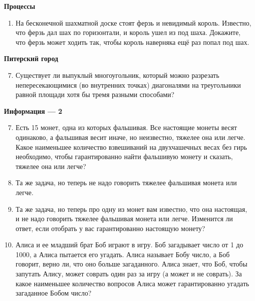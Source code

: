 \documentclass{article}
\begin{document}
\large
	
	\begin{center}
		\textbf{Процессы}
	\end{center}
	
	\begin{enumerate}
		
		\item[\protect\fbox{10}] На бесконечной шахматной доске стоят ферзь и невидимый король. Известно, что ферзь дал шах по горизонтали, и король ушел из под шаха. Докажите, что ферзь может ходить так, чтобы король наверняка ещё раз попал под шах.
		
	\end{enumerate}

	\begin{center}
		\textbf{Питерский город}
	\end{center}
	\begin{enumerate}[label*=\protect\fbox{\arabic{enumi}}]
		\setcounter{enumi}{6}
		
		\item Существует ли выпуклый многоугольник, который можно разрезать непересекающимися (во внутренних точках) диагоналями на треугольники равной площади хотя бы тремя разными способами?
		
	\end{enumerate}

	
	\begin{center}
		\textbf{Информация --- 2}
	\end{center}
	
	\begin{enumerate}[label*=\protect\fbox{\arabic{enumi}}]
	
		\setcounter{enumi}{6}
		\item Есть 15 монет, одна из которых фальшивая. Все настоящие монеты весят одинаково, а фальшивая весит иначе, но неизвестно, тяжелее она или легче. Какое наименьшее количество взвешиваний на двухчашечных весах без гирь необходимо, чтобы гарантированно найти фальшивую монету и сказать, тяжелее она или легче?
		
		\setcounter{enumi}{7}
		\item Та же задача, но теперь не надо говорить тяжелее фальшивая монета или легче.
		
		\setcounter{enumi}{8}
		\item Та же задача, но теперь про одну из монет вам известно, что она настоящая, и не надо говорить тяжелее фальшивая монета или легче. Изменится ли ответ, если отобрать у вас гарантированно настоящую монету?
		
		\setcounter{enumi}{9}
		\item Алиса и ее младший брат Боб играют в игру. Боб загадывает число от 1 до 1000, а Алиса пытается его угадать. Алиса называет Бобу число, а Боб говорит, верно ли, что оно больше загаданного. Алиса знает, что Боб, чтобы запутать Алису, может соврать один раз за игру (а может и не соврать). За какое наименьшее количество вопросов Алиса может гарантированно угадать загаданное Бобом число?
	\end{enumerate}
	
\end{document}
